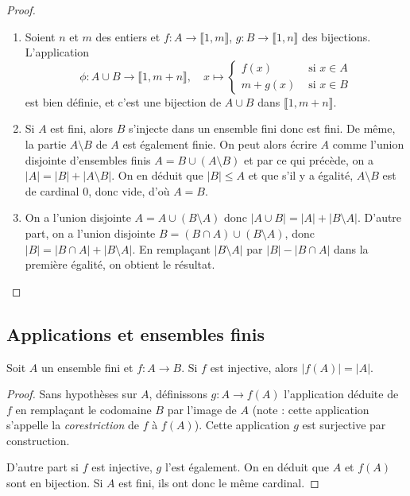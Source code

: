 \begin{proof}
\begin{enumerate}
\item Soient $n$ et $m$ des entiers et $f : A\to \llbracket 1,m\rrbracket$, $g : B\to \llbracket 1,n\rrbracket$ des bijections. L'application 
\[
\phi : A\cup B \to \llbracket 1,m+n\rrbracket, \quad x\mapsto
\begin{cases}
f(x) & \text{ si }x\in A\\
m+g(x) & \text{ si }x\in B
\end{cases}
\]
est bien définie, et c'est une bijection de $A\cup B$ dans $\llbracket 1,m+n\rrbracket$.
\item Si $A$ est fini, alors $B$ s'injecte dans un ensemble fini donc est fini. De même, la partie $A\setminus B$ de $A$ est également finie. On peut alors écrire $A$ comme l'union disjointe d'ensembles finis $A=B \cup (A\setminus B)$ et par ce qui précède, on a $|A|=|B|+|A\setminus B|$. On en déduit que $|B|\leq A$ et que s'il y a égalité, $A\setminus B$ est de cardinal $0$, donc vide, d'où $A=B$.
\item On a l'union disjointe $A = A\cup (B\setminus A)$  donc $|A\cup B| = |A|+|B\setminus A|$.
D'autre part, on a l'union disjointe $B = (B\cap A) \cup (B\setminus A)$, donc $|B| = |B\cap A|+|B\setminus A|$.
En remplaçant $|B\setminus A|$ par $|B|-|B\cap A|$ dans la première égalité, on obtient le résultat.
\end{enumerate}
\end{proof}

\subsection{Applications et ensembles finis}

\begin{proposition}
Soit $A$ un ensemble fini et $f:A\to B$. 
Si $f$ est injective, alors $|f(A)|=|A|$.
\end{proposition}
\begin{proof}
Sans hypothèses sur $A$, définissons $g : A\to f(A)$ l'application déduite de $f$ en remplaçant le codomaine $B$ par l'image de $A$ (note : cette application s'appelle la \emph{corestriction} de $f$ à $f(A)$). Cette application $g$ est surjective par construction.

D'autre part si $f$ est injective, $g$ l'est également. On en déduit que $A$ et $f(A)$ sont en bijection. Si $A$ est fini, ils ont donc le même cardinal.
\end{proof}

